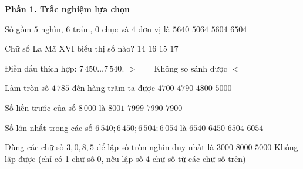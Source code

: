 \textbf{Phần 1. Trắc nghiệm lựa chọn}

\begin{ex} %
Số gồm $5$ nghìn, $6$ trăm, $0$ chục và $4$ đơn vị là
\choice
{$5640$}
{$5064$}
{\True $5604$}
{$6504$}
\end{ex}

\begin{ex} %
Chữ số La Mã $\text{XVI}$ biểu thị số nào?
\choice
{$14$}
{\True $16$}
{$15$}
{$17$}
\end{ex}

\begin{ex} %
Điền dấu thích hợp: $7\,450 \dots 7\,540$.
\choice
{$>$}
{$=$}
{Không so sánh được}
{\True $<$}
\end{ex}

\begin{ex} %
Làm tròn số $4\,785$ đến hàng trăm ta được
\choice
{$4700$}
{$4790$}
{\True $4800$}
{$5000$}
\end{ex}

\begin{ex} %
Số liền trước của số $8\,000$ là
\choice
{$8001$}
{\True $7999$}
{$7990$}
{$7900$}
\end{ex}

\begin{ex} %
Số lớn nhất trong các số $6\,540; 6\,450; 6\,504; 6\,054$ là
\choice
{\True $6540$}
{$6450$}
{$6504$}
{$6054$}
\end{ex}

\begin{ex} %
Dùng các chữ số $3, 0, 8, 5$ để lập số tròn nghìn duy nhất là
\choice
{$3000$}
{$8000$}
{$5000$}
{\True Không lập được (chỉ có 1 chữ số 0, nếu lập số 4 chữ số từ các chữ số trên)}
\end{ex}

